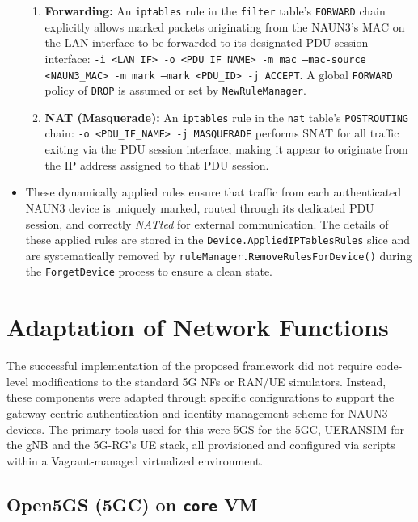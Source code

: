 \begin{itemize}
{\begin{enumerate}
            \item \textbf{Forwarding:} An \texttt{iptables} rule in the \texttt{filter} table's \texttt{FORWARD} chain explicitly allows marked packets originating from the \ac{NAUN3}'s \ac{MAC} on the \ac{LAN} interface to be forwarded to its designated \ac{PDU} session interface: \texttt{-i <LAN\_IF> -o <PDU\_IF\_NAME> -m mac --mac-source <NAUN3\_MAC> -m mark --mark <PDU\_ID> -j ACCEPT}. A global \texttt{FORWARD} policy of \texttt{DROP} is assumed or set by \texttt{NewRuleManager}.
            
            \item \textbf{\ac{NAT} (Masquerade):} An \texttt{iptables} rule in the \texttt{nat} table's \texttt{POSTROUTING} chain: \texttt{-o <PDU\_IF\_NAME> -j MASQUERADE} performs \ac{SNAT} for all traffic exiting via the \ac{PDU} session interface, making it appear to originate from the \ac{IP} address assigned to that \ac{PDU} session.
        \end{enumerate}
    }
    
    \item These dynamically applied rules ensure that traffic from each authenticated \ac{NAUN3} device is uniquely marked, routed through its dedicated \ac{PDU} session, and correctly \textit{NATted} for external communication. The details of these applied rules are stored in the \texttt{Device.AppliedIPTablesRules} slice and are systematically removed by \texttt{ruleManager.RemoveRulesForDevice()} during the \texttt{ForgetDevice} process to ensure a clean state.
    
\end{itemize}

\section{Adaptation of Network Functions}

The successful implementation of the proposed framework did not require code-level modifications to the standard \ac{5G} \acp{NF} or \ac{RAN}/\ac{UE} simulators. Instead, these components were adapted through specific configurations to support the gateway-centric authentication and identity management scheme for \ac{NAUN3} devices. The primary tools used for this were \Open5GS for the \ac{5GC}, UERANSIM for the \ac{gNB} and the \ac{5G-RG}'s \ac{UE} stack, all provisioned and configured via scripts within a Vagrant-managed virtualized environment.

\subsection{Open5GS (\ac{5GC}) on \texttt{core} \ac{VM}}

